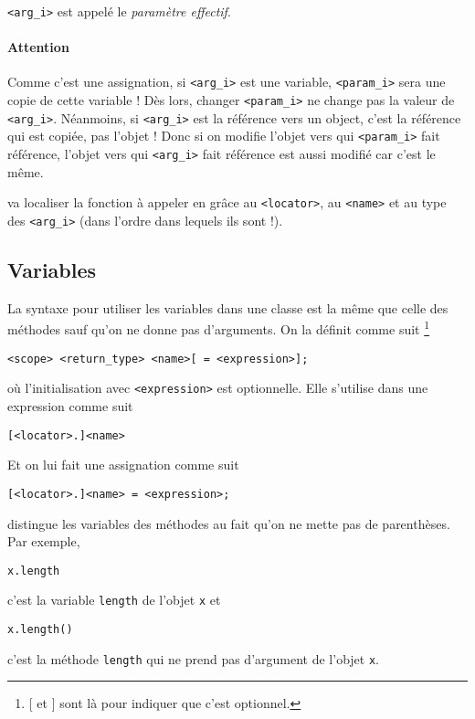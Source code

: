 \begin{itemize}
    \lstinline|<arg_i>| est appelé le \emph{paramètre effectif}.
    \paragraph{Attention} Comme c'est une assignation,
    si \lstinline|<arg_i>| est une variable, \lstinline|<param_i>| sera une copie de
    cette variable !
    Dès lors, changer \lstinline|<param_i>| ne change pas la valeur de
    \lstinline|<arg_i>|.
    Néanmoins, si \lstinline|<arg_i>| est la référence vers
    un object, c'est la référence qui est copiée, pas l'objet !
    Donc si on modifie l'objet vers qui \lstinline|<param_i>| fait référence,
    l'objet vers qui \lstinline|<arg_i>| fait référence est aussi modifié car
    c'est le même.
\end{itemize}
\java{} va localiser la fonction à appeler en grâce au \lstinline|<locator>|,
au \lstinline|<name>| et au type des \lstinline|<arg_i>|
(dans l'ordre dans lequels ils sont !).

\subsection{Variables}
La syntaxe pour utiliser les variables dans une classe est la même
que celle des méthodes sauf qu'on ne donne pas d'arguments.
On la définit comme suit
\footnote{[ et ] sont là pour indiquer que c'est optionnel.}
\begin{lstlisting}
<scope> <return_type> <name>[ = <expression>];
\end{lstlisting}
où l'initialisation avec \lstinline|<expression>| est optionnelle.
Elle s'utilise dans une expression comme suit
\begin{lstlisting}
[<locator>.]<name>
\end{lstlisting}
Et on lui fait une assignation comme suit
\begin{lstlisting}
[<locator>.]<name> = <expression>;
\end{lstlisting}

\java{} distingue les variables des méthodes au fait qu'on ne mette pas
de parenthèses.
Par exemple,
\begin{lstlisting}
x.length
\end{lstlisting}
c'est la variable \lstinline|length| de l'objet \lstinline|x| et
\begin{lstlisting}
x.length()
\end{lstlisting}
c'est la méthode \lstinline|length|
qui ne prend pas d'argument de l'objet \lstinline|x|.

